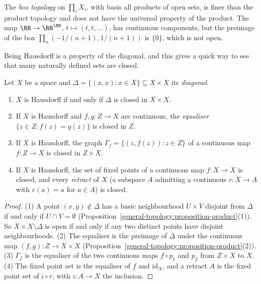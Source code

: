 \begin{counterexample}\label{general-topology:counterexample-box-topology}
The \emph{box topology} on $\prod_i X_i$, with basis all products of open sets, is finer than the product topology and does not have the universal
property of the product. The map $\RR \to \RR^{\NN}$, $t \mapsto (t, t, \ldots)$, has continuous components, but the preimage of the box
$\prod_{n} (-1/(n+1), 1/(n+1))$ is $\{0\}$, which is not open.
\end{counterexample}

Being Hausdorff is a property of the diagonal, and this gives a quick way to see that many naturally defined sets are closed.

\begin{proposition}\label{general-topology:proposition-hausdorff-diagonal}
Let $X$ be a space and $\Delta = \{(x, x) : x \in X\} \subseteq X \times X$ its \emph{diagonal}.
\begin{enumerate}
\item $X$ is Hausdorff if and only if $\Delta$ is closed in $X \times X$.
\item If $X$ is Hausdorff and $f, g \colon Z \to X$ are continuous, the \emph{equaliser} $\{z \in Z : f(z) = g(z)\}$ is closed in $Z$.
\item If $X$ is Hausdorff, the graph $\Gamma_f = \{(z, f(z)) : z \in Z\}$ of a continuous map $f \colon Z \to X$ is closed in $Z \times X$.
\item If $X$ is Hausdorff, the set of fixed points of a continuous map $f \colon X \to X$ is closed, and every \emph{retract} of $X$ (a subspace $A$ admitting a continuous $r \colon X \to A$ with $r(a) = a$ for $a \in A$) is closed.
\end{enumerate}
\end{proposition}

\begin{proof}
(1) A point $(x, y) \notin \Delta$ has a basic neighbourhood $U \times V$ disjoint from $\Delta$ if and only if $U \cap V = \emptyset$ (Proposition~\ref{general-topology:proposition-product}(1)). So $X \times X \setminus \Delta$ is open if and only if
any two distinct points have disjoint neighbourhoods. (2) The equaliser is the preimage of $\Delta$ under the continuous map $(f, g) \colon Z \to X \times X$ (Proposition~\ref{general-topology:proposition-product}(2)). (3) $\Gamma_f$ is the
equaliser of the two continuous maps $f \circ p_1$ and $p_2$ from $Z \times X$ to $X$. (4) The fixed point set is the equaliser of $f$ and $\mathrm{id}_X$, and a retract $A$ is the fixed point set of $i \circ r$, with $i \colon A \to X$ the
inclusion.
\end{proof}

